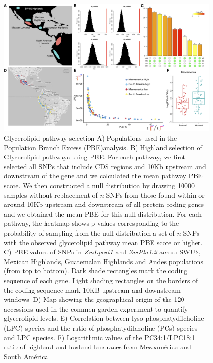 \documentclass[9pt,twocolumn,twoside]{BioRxiv}
\begin{document}
\begin{figure}[h]
\begin{center}
\includegraphics[width=0.7\paperwidth]{Figures/Fig_1.png}
\caption{Glycerolipid pathway selection 
A) Populations used in the Population Branch Excess (PBE)analysis. 
B) Highland selection of Glycerolipid pathways using PBE. 
For each pathway, we first selected all SNPs that include CDS regions and 10Kb upstream and downstream of the gene and we calculated the mean pathway PBE score. 
We then constructed a null distribution by drawing 10000 samples without replacement of $n$ SNPs from those found within or around 10Kb upstream and downstream of all protein coding genes and we obtained the mean PBE for this null distribution. 
For each pathway, the heatmap shows p-values corresponding to the probability of sampling from the null distribution a set of $n$ SNPs with the observed glycerolipid pathway mean PBE score or higher.
C) PBE values of SNPs in \textit{ZmLpcat1} and \textit{ ZmPla1.2} across SWUS, Mexican Highlands, Guatemalan Highlands and Andes populations (from top to bottom). Dark shade rectangles mark the coding sequence of each gene. Light shading rectangles on the borders of the coding sequence mark 10KB upstream and downstream windows. 
D) Map showing the geographical origin of the 120 accessions used in the common garden experiment to quantify glycerolipid levels.
E) Correlation between  lyso-phosphatydilcholine (LPC) species and the ratio of  phosphatydilcholine (PCs) species and LPC species. 
F) Logarithmic values of the PC34:1/LPC18:1 ratio of highland and lowland landraces from Mesoamérica and South América} 

\label{Fig1}
\end{center}
\end{figure} 
\end{document}
